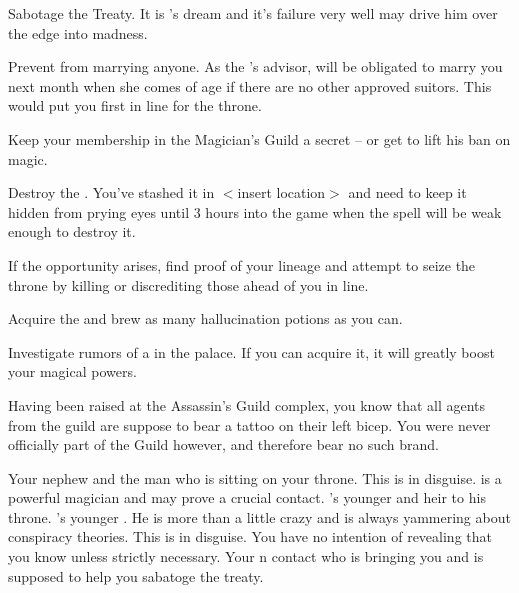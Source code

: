\documentclass[char]{NeptuneBall}
\begin{document}
\begin{itemz}[Goals]
  \item Sabotage the Treaty. It is \cKing{}'s dream and it's failure very well may drive him over the edge into madness.
  \item Prevent \cPrincess{} from marrying anyone. As the \cKing{\King}'s advisor, \cPrincess{\they} will be obligated to marry you next month when she comes of age if there are no other approved suitors. This would put you first in line for the throne.
  \item Keep your membership in the Magician's Guild a secret -- or get \cKing{\King} \cKing{} to lift his ban on magic.
  \item Destroy the \iMusicBox{}. You've stashed it in $<$insert location$>$ and need to keep it hidden from prying eyes until 3 hours into the game when the spell will be weak enough to destroy it.
  \item If the opportunity arises, find proof of your lineage and attempt to seize the throne by killing or discrediting those ahead of you in line.
  \item Acquire the \iHemlock{} and brew as many hallucination potions as you can.
  \item Investigate rumors of a \iGlowShell{\MYname} in the palace. If you can acquire it, it will greatly boost your magical powers.
\end{itemz}

\begin{itemz}[Notes]
  \item Having been raised at the Assassin's Guild complex, you know that all agents from the guild are suppose to bear a tattoo on their left bicep. You were never officially part of the Guild however, and therefore bear no such brand.
\end{itemz}

\begin{contacts}
  \contact{\cKing{}} Your nephew and the man who is sitting on your throne.
  \contact{\cWitch{\MYname}} This is \cWitch{} in disguise. \cWitch{\They} is a powerful magician and may prove a crucial contact.
  \contact{\cPrincess{}} \cKing{}'s younger \cPrincess{\offspring} and heir to his throne.
  \contact{\cPlant{}} \cKing{}'s younger \cPlant{\sibling}. He is more than a little crazy and is always yammering about conspiracy theories.
  \contact{\cQueen{\MYname}} This is \cQueen{} in disguise. You have no intention of revealing that you know \cQueen{\them} unless strictly necessary.
  \contact{\cSpy{}} Your \pPacifica{}n contact who is bringing you \iHemlock{} and is supposed to help you sabatoge the treaty.
\end{contacts}
\end{document}
